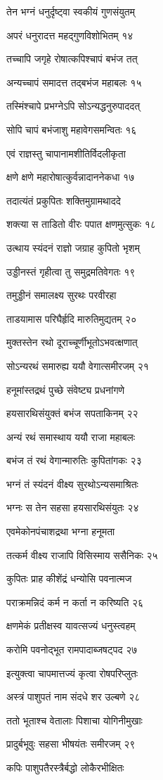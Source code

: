 तेन भग्नं धनुर्दृष्ट्वा स्वकीयं गुणसंयुतम्

अपरं धनुरादत्त महद्गुणविशोभितम् १४

तच्चापि जगृहे रोषात्कपिश्चापं बभंज तत्

अन्यच्चापं समादत्त तद्बभंज महाबलः १५

तस्मिंश्चापे प्रभग्नेऽपि सोऽन्यद्धनुरुपाददत्

सोपि चापं बभंजाशु महावेगसमन्वितः १६

एवं राज्ञस्तु चापानामशीतिर्विदलीकृता

क्षणे क्षणे महारोषात्कुर्वन्नादाननेकधा १७

तदात्यंतं प्रकुपितः शक्तिमुग्रामथाददे

शक्त्या स ताडितो वीरः पपात क्षणमुत्सुकः १८

उत्थाय स्यंदनं राज्ञो जग्राह कुपितो भृशम्

उड्डीनस्तं गृहीत्वा तु समुद्रमतिवेगतः १९

तमुड्डीनं समालक्ष्य सुरथः परवीरहा

ताडयामास परिघैर्हृदि मारुतिमुद्यतम् २०

मुक्तस्तेन रथो दूराच्चूर्णीभूतोऽभवत्क्षणात्

सोऽन्यरथं समारुह्य ययौ वेगात्समीरजम् २१

हनूमांस्तद्रथं पुच्छे संवेष्ट्य प्रधनांगणे

हयसारथिसंयुक्तं बभंज सपताकिनम् २२

अन्यं रथं समास्थाय ययौ राजा महाबलः

बभंज तं रथं वेगान्मारुतिः कुपितांगकः २३

भग्नं तं स्यंदनं वीक्ष्य सुरथोऽन्यसमाश्रितः

भग्नः स तेन सहसा हयसारथिसंयुतः २४

एवमेकोनपंचाशद्रथा भग्ना हनूमता

तत्कर्म वीक्ष्य राजापि विसिस्माय ससैनिकः २५

कुपितः प्राह कीशेंद्रं धन्योसि पवनात्मज

पराक्रमन्निदं कर्म न कर्ता न करिष्यति २६

क्षणमेकं प्रतीक्षस्व यावत्सज्यं धनुस्त्वहम्

करोमि पवनोद्भूत रामपादाब्जषट्पद २७

इत्युक्त्वा चापमात्तज्यं कृत्वा रोषपरिप्लुतः

अस्त्रं पाशुपतं नाम संदधे शर उल्बणे २८

ततो भूताश्च वेतालाः पिशाचा योगिनीमुखाः

प्रादुर्बभूवुः सहसा भीषयंतः समीरजम् २९

कपिः पाशुपतैरस्त्रैर्बद्धो लोकैरभीक्षितः

